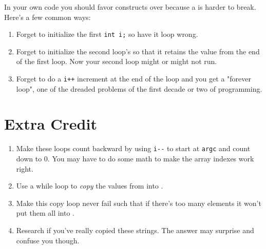 In your own code you should favor  constructs over
 because a  is harder to break.  Here's a few
common ways:

\begin{enumerate}
\item Forget to initialize the first \verb|int i;| so have it 
    loop wrong.
\item Forget to initialize the second loop's  so that it
    retains the value from the end of the first loop.  Now your 
    second loop might or might not run.
\item Forget to do a \verb|i++| increment at the end of the loop
    and you get a "forever loop", one of the dreaded problems
    of the first decade or two of programming.
\end{enumerate}

\section{Extra Credit}

\begin{enumerate}
\item Make these loops count backward by using \verb|i--| to start
    at \verb|argc| and count down to 0.  You may have to do some
    math to make the array indexes work right.
\item Use a while loop to \emph{copy} the values from 
    into .
\item Make this copy loop never fail such that if there's too many
     elements it won't put them all into .
\item Research if you've really copied these strings.  The answer may
    surprise and confuse you though.
\end{enumerate}


